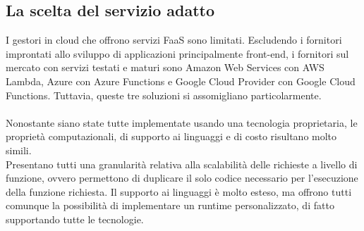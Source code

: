 \subsection{La scelta del servizio adatto}

I gestori in cloud che offrono servizi FaaS sono limitati.
Escludendo i fornitori improntati allo sviluppo di applicazioni principalmente front-end,
i fornitori sul mercato con servizi testati e maturi sono 
Amazon Web Services con AWS Lambda, Azure con Azure Functions e Google Cloud Provider con Google Cloud Functions.
Tuttavia, queste tre soluzioni si assomigliano particolarmente.\\
\\
Nonostante siano state tutte implementate usando una tecnologia proprietaria,
le proprietà computazionali, di supporto ai linguaggi e di costo risultano molto simili.\\
Presentano tutti una granularità relativa alla scalabilità delle richieste a livello di funzione,
ovvero permettono di duplicare il solo codice necessario per l'esecuzione della funzione richiesta.
Il supporto ai linguaggi è molto esteso, 
ma offrono tutti comunque la possibilità di implementare un runtime personalizzato,
di fatto supportando tutte le tecnologie.\\


